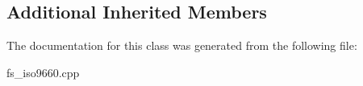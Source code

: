 \subsection*{Additional Inherited Members}


The documentation for this class was generated from the following file\+:\begin{DoxyCompactItemize}
\item 
fs\+\_\+iso9660.\+cpp\end{DoxyCompactItemize}
